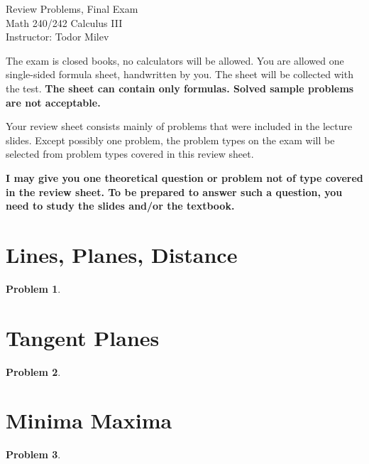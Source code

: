 \documentclass{article}
\newtheorem{problem}{Problem}
\begin{document}
\begin{center}
\Large
Review Problems, Final Exam\\ Math 240/242 Calculus III \\ \normalsize Instructor: Todor Milev
\end{center}


\noindent The exam is closed books, no calculators will be allowed. You are allowed one single-sided formula sheet, handwritten by you. The sheet will be collected with the test. \textbf{The sheet can contain only formulas. Solved sample problems are not acceptable.}

Your review sheet consists mainly of problems that were included in the lecture slides. Except possibly one problem, the problem types on the exam will be selected from problem types covered in this review sheet. 


\textbf{I may give you one theoretical question or problem not of type covered in the review sheet. To be prepared to answer such a question, you need to study the slides and/or the textbook.} 
\section{Lines, Planes, Distance}
\begin{problem}

\end{problem}



\section{Tangent Planes}
\begin{problem}

\end{problem}


\section{Minima Maxima}
\begin{problem}

\end{problem}
\end{document}
